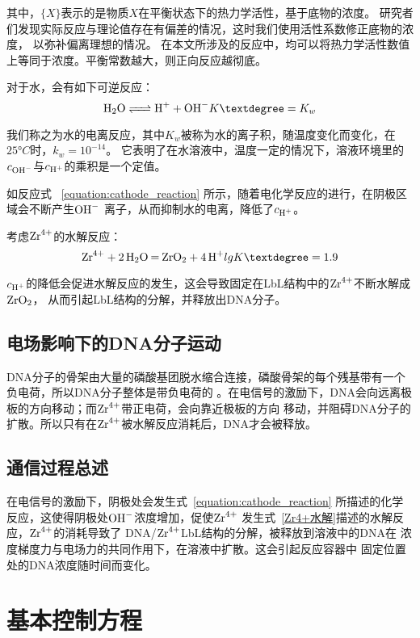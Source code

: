 其中，{$\{X\}$}表示的是物质$X$在平衡状态下的热力学活性，基于底物的浓度。
研究者们发现实际反应与理论值存在有偏差的情况，这时我们使用活性系数修正底物的浓度，
以弥补偏离理想的情况\cite{Königsberger2017}。
在本文所涉及的反应中，均可以将热力学活性数值上等同于浓度。平衡常数越大，则正向反应越彻底。

对于水，会有如下可逆反应：
\begin{equation}
    \ce{H2O <=> H+ + OH-} \quad K°=K_w
\end{equation}

我们称之为水的电离反应，其中$K_w$被称为水的离子积，随温度变化而变化，在$25°C$时，$k_w=10^{-14}$。
它表明了在水溶液中，温度一定的情况下，溶液环境里的$c_{\ce{OH-}}$与$c_{\ce{H+}}$的乘积是一个定值。

如反应式 ~\ref{equation:cathode_reaction} 所示，随着电化学反应的进行，在阴极区域会不断产生$\ce{OH-}$
离子，从而抑制水的电离，降低了$c_{\ce{H+}}$。

考虑$\ce{Zr^4+}$的水解反应\cite{Thoenen2004Development}：
\begin{equation}
    \ce{Zr^4+ +2 H2O  = ZrO2 + 4H+} \quad lgK°=1.9
    \label{Zr4+水解}
\end{equation}

$c_{\ce{H+}}$的降低会促进水解反应的发生，这会导致固定在LbL结构中的$\ce{Zr^4+}$不断水解成$\ce{ZrO2}$，
从而引起LbL结构的分解，并释放出DNA分子。

\subsection{电场影响下的DNA分子运动}
DNA分子的骨架由大量的磷酸基团脱水缩合连接，磷酸骨架的每个残基带有一个负电荷，所以DNA分子整体是带负电荷的
\cite{Lipfert2014}。在电信号的激励下，DNA会向远离极板的方向移动；而$\ce{Zr^4+}$带正电荷，会向靠近极板的方向
移动，并阻碍DNA分子的扩散。所以只有在$\ce{Zr^4+}$被水解反应消耗后，DNA才会被释放。

\subsection{通信过程总述}
在电信号的激励下，阴极处会发生式~\ref{equation:cathode_reaction}
所描述的化学反应，这使得阴极处$\ce{OH-}$浓度增加，促使$\ce{Zr^4+}$
发生式~\ref{Zr4+水解}描述的水解反应，$\ce{Zr^4+}$的消耗导致了
DNA/$\ce{Zr^{4+}}$LbL结构的分解，被释放到溶液中的DNA在
浓度梯度力与电场力的共同作用下，在溶液中扩散。这会引起反应容器中
固定位置处的DNA浓度随时间而变化。

\section{基本控制方程}
